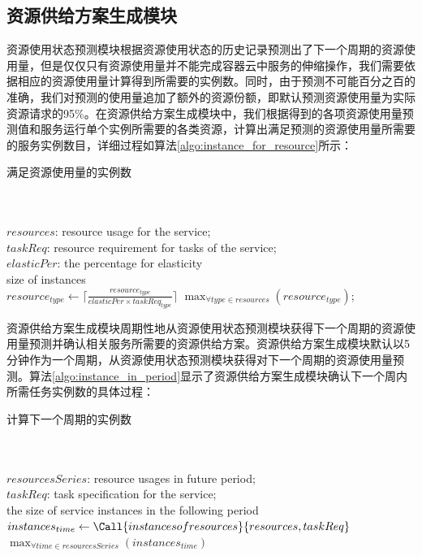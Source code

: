 \subsection{资源供给方案生成模块}\label{sec:provision_active}
资源使用状态预测模块根据资源使用状态的历史记录预测出了下一个周期的资源使用量，但是仅仅只有资源使用量并不能完成容器云中服务的伸缩操作，我们需要依据相应的资源使用量计算得到所需要的实例数。同时，由于预测不可能百分之百的准确，我们对预测的使用量追加了额外的资源份额，即默认预测资源使用量为实际资源请求的95\%。在资源供给方案生成模块中，我们根据得到的各项资源使用量预测值和服务运行单个实例所需要的各类资源，计算出满足预测的资源使用量所需要的服务实例数目，详细过程如算法\ref{algo:instance_for_resource}所示：
\begin{algorithm}[h]
\caption{满足资源使用量的实例数}
\label{algo:instance_for_resource}
\begin{algorithmic}[0]
\\
\Require ~~\
\\
$resources$: resource usage for the service;\\
$taskReq$: resource requirement for tasks of the service;\\
$elasticPer$: the percentage for elasticity
\Ensure ~~\
\\
size of instances \\

        \State $resource_{type} \gets  \lceil \frac{resource_{type}}{{elasticPer} \times {taskReq_{type}}} \rceil$
    \EndFor
    \State \Return $\max_{\forall type \in resources} {(resource_{type})}$;
\EndFunction
\end{algorithmic}
\end{algorithm}

资源供给方案生成模块周期性地从资源使用状态预测模块获得下一个周期的资源使用量预测并确认相关服务所需要的资源供给方案。资源供给方案生成模块默认以5分钟作为一个周期，从资源使用状态预测模块获得对下一个周期的资源使用量预测。算法\ref{algo:instance_in_period}显示了资源供给方案生成模块确认下一个周内所需任务实例数的具体过程：
\begin{algorithm}[H]
\caption{计算下一个周期的实例数}
\label{algo:instance_in_period}
\begin{algorithmic}[0]
\\
\Require ~~\
\\
$resourcesSeries$: resource usages in future period;\\
$taskReq$: task specification for the service;
\Ensure ~~\
\\
the size of service instances in the following period\\

    \State $instances_{time} \gets \Call{instancesofresources}{{resources}, {taskReq}}$
\EndFor
\State \Return $\max_{\forall time \in resourcesSeries} {(instances_{time})}$
\end{algorithmic}
\end{algorithm}

